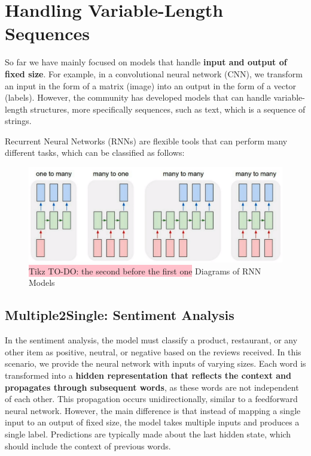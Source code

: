 \section{Handling Variable-Length Sequences}

So far we have mainly focused on models that handle \textbf{input and output of fixed size}. For example, in a convolutional neural network (CNN), we transform an input in the form of a matrix (image) into an output in the form of a vector (labels). However, the community has developed models that can handle variable-length structures, more specifically sequences, such as text, which is a sequence of strings.

Recurrent Neural Networks (RNNs) are flexible tools that can perform many different tasks, which can be classified as follows:

\begin{figure}[!htbp]
    \centering
    \includegraphics[width=\textwidth]{tikz/chapter6 - Types of RNN Models.png}
    \caption{{\color{red}\colorbox{pink}{Tikz TO-DO: the second before the first one}} Diagrams of RNN Models}
\end{figure}

\subsection{Multiple2Single: Sentiment Analysis}

In the sentiment analysis, the model must classify a product, restaurant, or any other item as positive, neutral, or negative based on the reviews received. In this scenario, we provide the neural network with inputs of varying sizes. Each word is transformed into a \textbf{hidden representation that reflects the context and propagates through subsequent words}, as these words are not independent of each other. This propagation occurs unidirectionally, similar to a feedforward neural network. However, the main difference is that instead of mapping a single input to an output of fixed size, the model takes multiple inputs and produces a single label. Predictions are typically made about the last hidden state, which should include the context of previous words.

